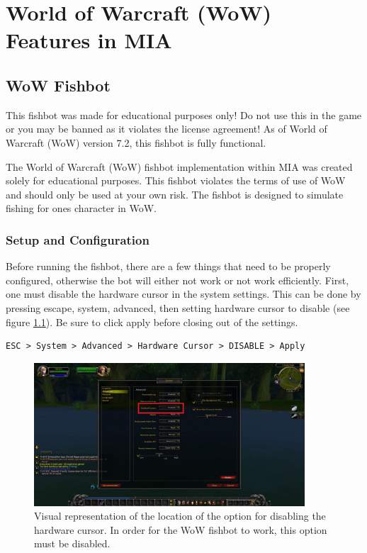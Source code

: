 \chapter{World of Warcraft (WoW) Features in MIA} \label{WoW}
\pagestyle{fancy}

\section{WoW Fishbot} \label{WoWFishbot}

\begin{note}
	This fishbot was made for educational purposes only! Do not use this in the game or you may be banned as it violates the license agreement! As of World of Warcraft (WoW) version 7.2, this fishbot is fully functional.
\end{note}

The World of Warcraft (WoW) fishbot implementation within MIA was created solely for educational purposes. This fishbot violates the terms of use of WoW and should only be used at your own risk. The fishbot is designed to simulate fishing for ones character in WoW. 

\subsection{Setup and Configuration}

Before running the fishbot, there are a few things that need to be properly configured, otherwise the bot will either not work or not work efficiently. First, one must disable the hardware cursor in the system settings. This can be done by pressing escape, system, advanced, then setting hardware cursor to disable (see figure \ref{hardwar cursor}). Be sure to click apply before closing out of the settings.

\begin{lstlisting}
ESC > System > Advanced > Hardware Cursor > DISABLE > Apply
\end{lstlisting}

\begin{figure}[h]
	\centering
	\includegraphics[width=0.9\textwidth]{images/WoWScrnShot_040118_234154.jpg}
	\caption{Visual representation of the location of the option for disabling the hardware cursor. In order for the WoW fishbot to work, this option must be disabled.} \label{hardwar cursor}
\end{figure}

